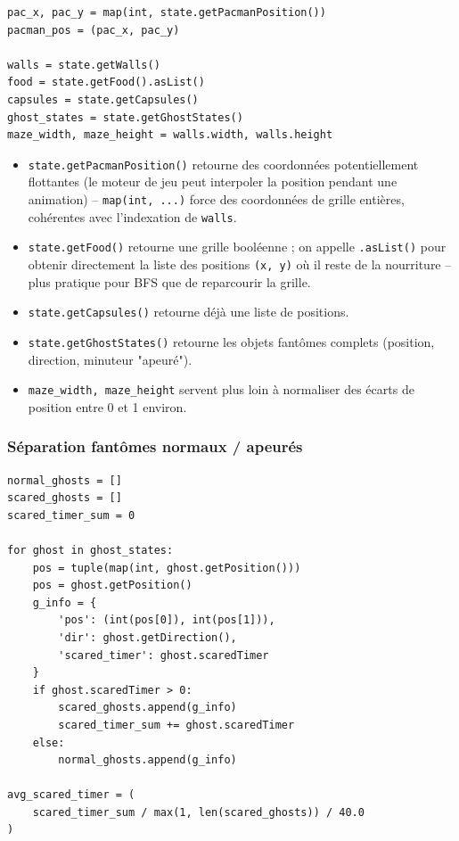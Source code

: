 \documentclass[a4paper,12pt]{article}
\begin{document}
\begin{lstlisting}
pac_x, pac_y = map(int, state.getPacmanPosition())
pacman_pos = (pac_x, pac_y)

walls = state.getWalls()
food = state.getFood().asList()
capsules = state.getCapsules()
ghost_states = state.getGhostStates()
maze_width, maze_height = walls.width, walls.height
\end{lstlisting}

\begin{itemize}
    \item \texttt{state.getPacmanPosition()} retourne des coordonnées
    potentiellement flottantes (le moteur de jeu peut interpoler la
    position pendant une animation) -- \texttt{map(int, ...)} force des
    coordonnées de grille entières, cohérentes avec l'indexation de
    \texttt{walls}.
    \item \texttt{state.getFood()} retourne une grille booléenne ; on
    appelle \texttt{.asList()} pour obtenir directement la liste des
    positions \texttt{(x, y)} où il reste de la nourriture -- plus
    pratique pour BFS que de reparcourir la grille.
    \item \texttt{state.getCapsules()} retourne déjà une liste de
    positions.
    \item \texttt{state.getGhostStates()} retourne les objets fantômes
    complets (position, direction, minuteur "apeuré").
    \item \texttt{maze\_width, maze\_height} servent plus loin à
    normaliser des écarts de position entre 0 et 1 environ.
\end{itemize}

\subsubsection{Séparation fantômes normaux / apeurés}

\begin{lstlisting}
normal_ghosts = []
scared_ghosts = []
scared_timer_sum = 0

for ghost in ghost_states:
    pos = tuple(map(int, ghost.getPosition()))
    pos = ghost.getPosition()
    g_info = {
        'pos': (int(pos[0]), int(pos[1])),
        'dir': ghost.getDirection(),
        'scared_timer': ghost.scaredTimer
    }
    if ghost.scaredTimer > 0:
        scared_ghosts.append(g_info)
        scared_timer_sum += ghost.scaredTimer
    else:
        normal_ghosts.append(g_info)

avg_scared_timer = (
    scared_timer_sum / max(1, len(scared_ghosts)) / 40.0
)
\end{lstlisting}
\end{document}
